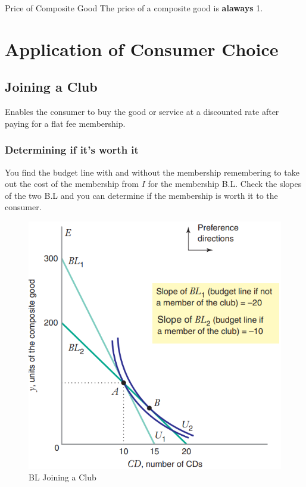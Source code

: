 \documentclass[../ECON-281-Notes.tex]{subfiles}
\begin{document}
\begin{DndSidebar}[color=PhbLightGreen]{Price of Composite Good}
    The price of a composite good is \textbf{alaways} 1. 
\end{DndSidebar}

\section{Application of Consumer Choice}

\subsection{Joining a Club}
Enables the consumer to buy the good or service at a discounted rate after paying for a flat fee membership.

\subsubsection{Determining if it's worth it}
You find the budget line with and without the membership remembering to take out the cost of the membership from \(I\) for the membership B.L.
Check the slopes of the two B.L and you can determine if the membership is worth it to the consumer.

\begin{figure}[htbp]
    \centering
    \includegraphics[width=0.8\columnwidth]{../assets/joining_a_club.png}
    \caption{BL Joining a Club}
    \label{fig:BL_join_club}
\end{figure}
\end{document}
